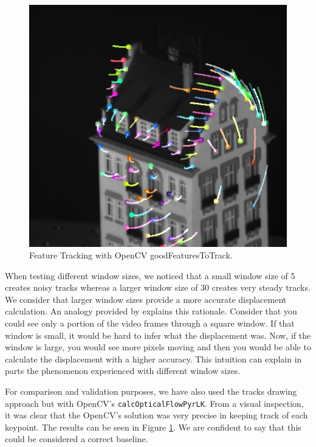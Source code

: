 \documentclass[]{IEEEtran}
\begin{document}
\begin{figure}[h]
  \includegraphics[width=\linewidth]{./figures/klt/klt-opencv-hotel.jpg}
  \caption{Feature Tracking with OpenCV goodFeaturesToTrack.}
  \label{fig:klt_opencv}
\end{figure}

When testing different window sizes, we noticed that a small window size of 5 creates noisy tracks whereas a larger window size of 30 creates very steady tracks. We consider that larger window sizes provide a more accurate displacement calculation. An analogy provided by \cite{illinois_cv} explains this rationale. Consider that you could see only a portion of the video frames through a square window. If that window is small, it would be hard to infer what the displacement was. Now, if the window is large, you would see more pixels moving and then you would be able to calculate the displacement with a higher accuracy. This intuition can explain in parts the phenomenon experienced with different window sizes.

For comparison and validation purposes, we have also used the tracks drawing approach but with OpenCV's \texttt{calcOpticalFlowPyrLK}. From a visual inspection, it was clear that the OpenCV's solution was very precise in keeping track of each keypoint. The results can be seen in Figure \ref{fig:klt_opencv}. We are confident to say that this could be considered a correct baseline.
\end{document}
